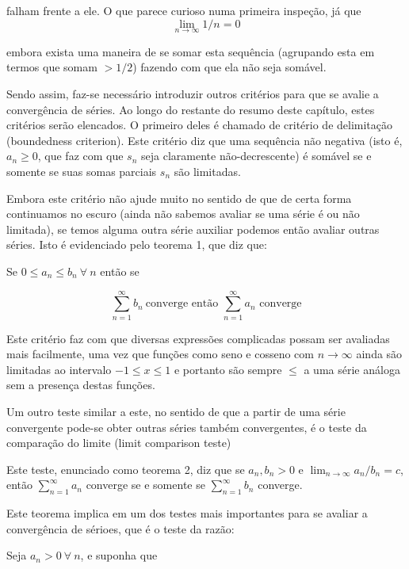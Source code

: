 \documentclass[a4paper, 12pt]{article}
\begin{document}
falham frente a ele. O que parece curioso numa primeira inspeção, já que 
\begin{equation}
	\nonumber \lim_{n \to \infty } 1/n = 0
\end{equation}

embora exista uma maneira de se somar esta sequência (agrupando esta em termos que somam $> 1/2$)
fazendo com que ela não seja somável. 

Sendo assim, faz-se necessário introduzir outros critérios para que se 
avalie a convergência de séries. Ao longo do restante do resumo deste capítulo, estes
critérios serão elencados. O primeiro deles é chamado de critério
de delimitação (boundedness criterion). Este critério diz que uma sequência não negativa (isto é,
$a_n \geq 0 $, que faz com que $s_n$ seja claramente não-decrescente) é somável se e somente se
suas somas parciais $s_n$ são limitadas.

Embora este critério não ajude muito no sentido de que de certa forma continuamos no escuro
(ainda não sabemos avaliar se uma série é ou não limitada), se temos alguma outra série auxiliar 
podemos então avaliar outras séries. Isto é evidenciado pelo teorema 1, que diz que:

Se $0 \leq a_n \leq b_n\ \forall \ n$ então se


\begin{equation}
	\nonumber \sum_{n=1}^{\infty}b_n\  \text{converge então } \sum_{n=1}^{\infty} a_n \text{ converge} 
\end{equation}

Este critério faz com que diversas expressões complicadas possam ser avaliadas mais facilmente,
uma vez que funções como seno e cosseno com $n \to \infty$ ainda são limitadas ao intervalo $ -1 \leq x \leq 1$ 
e portanto são sempre $\leq$ a uma série análoga sem a presença destas funções.

Um outro teste similar a este, no sentido de que a partir de uma série convergente pode-se 
obter outras séries também convergentes, é o teste da comparação do limite (limit comparison teste)

Este teste, enunciado como teorema 2, diz que se $a_n,b_n > 0$ e $\lim_{n \to \infty} a_n/b_n = c$, 
então $\sum_{n=1}^{\infty}a_n$ converge se e somente se $\sum_{n=1}^{\infty}b_n$ converge.

Este teorema implica em um dos testes mais importantes para se avaliar a convergência de sérioes, que
é o teste da razão:

Seja $a_n > 0 \ \forall \ n$, e suponha que 
\end{document}
